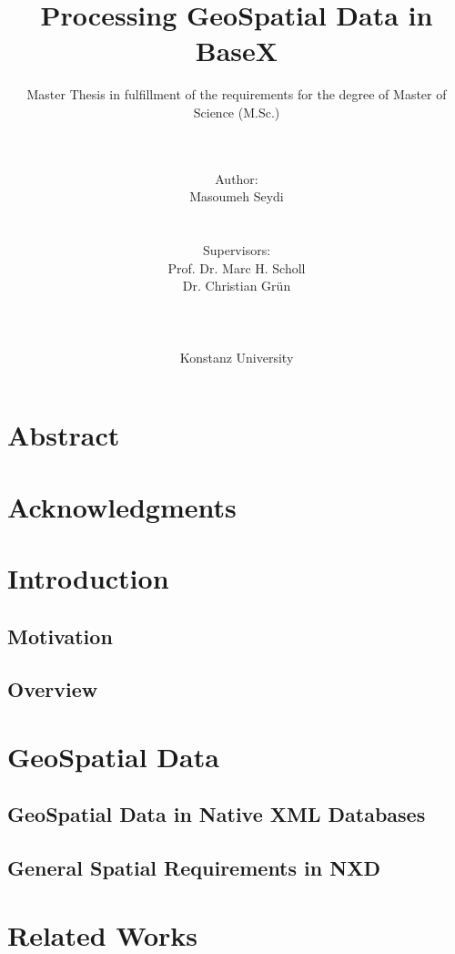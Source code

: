 \documentclass[a4paper,12pt]{article}
\title{Processing GeoSpatial Data in BaseX}
\subtitle{Master Thesis in fulfillment of the requirements for the degree of
Master of Science (M.Sc.)}
\author{\\\\Author: \\
	Masoumeh Seydi
	\\\\\\Supervisors: \\
	Prof. Dr. Marc H. Scholl \\ 
	Dr. Christian Gr{\"u}n \\
	\\\\\\
	Konstanz University}
\begin{document}
\maketitle
\thispagestyle{empty}

\newpage
\section*{Abstract}

\thispagestyle{empty}

\newpage
\section*{Acknowledgments}

\thispagestyle{empty}

\newpage
\tableofcontents

\thispagestyle{empty}
\newpage
\section{Introduction}
\setcounter{page}{1}

\subsection{Motivation}

\subsection{Overview}

\newpage
\section{GeoSpatial Data}

\subsection{GeoSpatial Data in Native XML Databases}

\subsection{General Spatial Requirements in NXD}

\newpage
\section{Related Works}

\newpage
\end{document}
